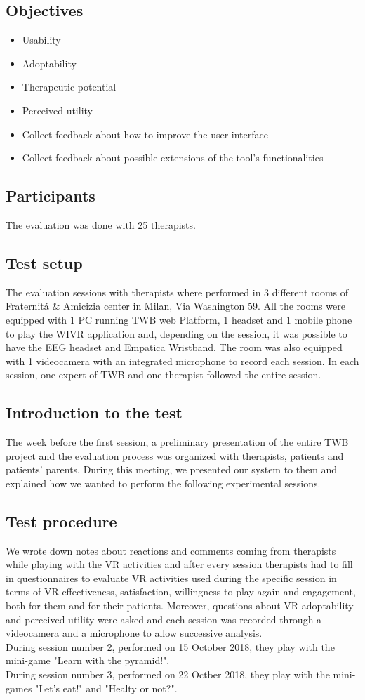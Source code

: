 \subsection{Objectives}
\begin{itemize}
\item Usability
\item Adoptability
\item Therapeutic potential
\item Perceived utility
\item Collect feedback about how to improve the user interface
\item Collect feedback about possible extensions of the tool's functionalities
\end{itemize}
\subsection{Participants}
The evaluation was done with 25 therapists.
\subsection{Test setup}
The evaluation sessions with therapists where performed in 3 different rooms of Fraternit\'a \& Amicizia center in Milan, Via Washington 59. All the rooms were equipped with 1 PC running TWB web Platform, 1 headset and 1 mobile phone to play the WIVR application and, depending on the session, it was possible to have the EEG headset and Empatica Wristband. The room was also equipped with 1 videocamera with an integrated microphone to record each session. In each session, one expert of TWB and one therapist followed the entire session.
\subsection{Introduction to the test}
The week before the first session, a preliminary presentation of the entire TWB project and the evaluation process was organized with therapists, patients and patients' parents. During this meeting, we presented our system to them and explained how we wanted to perform the following experimental sessions.
\subsection{Test procedure}
We wrote down notes about reactions and comments coming from therapists while playing with the VR activities and after every session therapists had to fill in questionnaires to evaluate VR activities used during the specific session in terms of VR effectiveness, satisfaction, willingness to play again and engagement, both for them and for their patients. Moreover, questions about VR adoptability and perceived utility were asked and each session was recorded through a videocamera and a microphone to allow successive analysis.\\
During session number 2, performed on 15 October 2018, they play with the mini-game "Learn with the pyramid!".\\
During session number 3, performed on 22 Octber 2018, they play with the mini-games "Let's eat!" and "Healty or not?".
